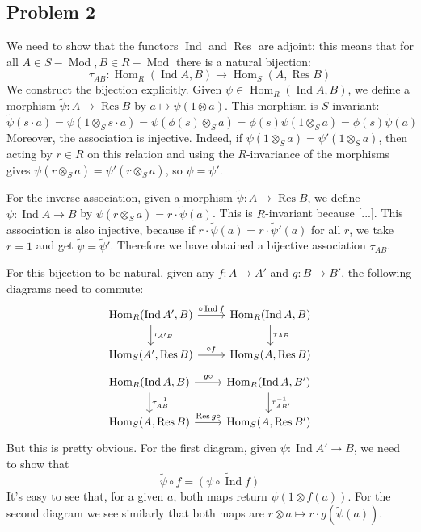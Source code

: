\documentclass[12 pt]{article}
\DeclareMathOperator{\Ind}{Ind}
\DeclareMathOperator{\Hom}{Hom}
\DeclareMathOperator {\Res} {Res}
\DeclareMathOperator {\Mod} {Mod}
\begin{document}
\subsection*{Problem 2}
We need to show that the functors $\Ind$ and $\Res$ are adjoint; this means that for all $A \in S-\Mod, B\in R-\Mod$ there is a natural bijection:
\[     \tau_{AB} : \Hom_R(\Ind A, B) \to \Hom_S(A, \Res B)      \]
We construct the bijection explicitly. Given $\psi \in \Hom_R (\Ind A, B)$, we define a morphism $\tilde \psi : A \to \Res B$ by $a \mapsto \psi(1 \otimes a)$. This morphism is $S$-invariant:
\[    \tilde \psi(s \cdot a) = \psi (1 \otimes_S s \cdot a) = \psi (\phi(s) \otimes_S a) = \phi(s) \psi(1 \otimes_S a) = \phi(s) \tilde \psi(a)      \]
Moreover, the association is injective. Indeed, if $\psi(1 \otimes_S a) = \psi' (1 \otimes_S a)$, then acting by $r\in R$ on this relation and using the $R$-invariance of the morphisms gives $\psi(r \otimes_S a) = \psi' (r \otimes_S a)$, so $\psi = \psi'$.

For the inverse association, given a morphism $\tilde \psi : A \to \Res B$, we define $\psi : \Ind A \to B$ by $\psi(r \otimes_S a) = r \cdot \tilde \psi(a)$. This is $R$-invariant because [...]. This association is also injective, because if $r \cdot \tilde \psi(a) = r\cdot \tilde \psi'(a)$ for all $r$, we take $r=1$ and get $\tilde \psi = \tilde \psi'$. Therefore we have obtained a bijective association $\tau_{AB}$.

For this bijection to be natural, given any $f : A \to A'$ and $g: B \to B'$, the following diagrams need to commute:
\[
\begin{tikzcd}
\Hom_R(\Ind A' , B) \arrow{r}{\circ \Ind f}\arrow{d}{\tau_{A'B}} &  \Hom_R(\Ind A , B)\arrow{d}{\tau_{AB}} \\
\Hom_S( A' , \Res B) \arrow{r}{\circ f}  &  \Hom_S( A ,\Res B)
\end{tikzcd}
\]
\[
\begin{tikzcd}
\Hom_R(\Ind A , B) \arrow{r}{g \circ}\arrow{d}{\tau^{-1}_{AB}} &  \Hom_R(\Ind A , B')\arrow{d}{\tau^{-1}_{AB'}} \\
\Hom_S( A , \Res B) \arrow{r}{\Res g\circ }  &  \Hom_S( A ,\Res B')
\end{tikzcd}
\]
But this is pretty obvious. For the first diagram, given $\psi : \Ind A' \to B$, we need to show that
\[        \tilde \psi \circ f = \tilde{ (\psi \circ \Ind f)}      \]
It's easy to see that, for a given $a$, both maps return $\psi(1 \otimes f(a))$. For the second diagram we see similarly that both maps are $r \otimes a \mapsto r \cdot g(\tilde \psi(a))$.
\end{document}
